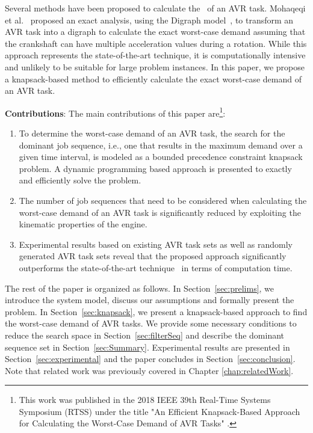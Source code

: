 Several methods have been proposed to calculate the \dbf~of an AVR task.
Mohaqeqi et al.~\cite{mohaqeqi_refinement_2017} proposed an exact analysis, using the Digraph model~\cite{stigge_digraph_2011}, to transform an AVR task into a digraph to calculate the exact worst-case demand assuming that the crankshaft can have multiple acceleration values during a rotation.
While this approach represents the state-of-the-art technique, it is computationally intensive and unlikely to be suitable for large problem instances.
In this paper, we propose a knapsack-based method to efficiently calculate the exact worst-case demand of an AVR task.

\noindent \textbf{Contributions}: The main contributions of this paper are\footnote{This work was published in the 2018 IEEE 39th Real-Time Systems Symposium (RTSS) under the title "An Efficient Knapsack-Based Approach for Calculating the Worst-Case Demand of AVR Tasks" \cite{bijinemula_efficient_2019}.}:
\begin{enumerate}
\item To determine the worst-case demand of an AVR task, the search for the dominant job sequence, i.e., one that results in the maximum demand over a given time interval, is modeled as a bounded precedence constraint knapsack problem.
A dynamic programming based approach is presented to exactly and efficiently solve the problem.
\item  The number of job sequences that need to be considered when calculating the worst-case demand of an AVR task is significantly reduced by exploiting the kinematic properties of the engine.
\item Experimental results based on existing AVR task sets as well as randomly generated AVR task sets reveal that the proposed approach significantly outperforms the state-of-the-art technique~\cite{mohaqeqi_refinement_2017} in terms of computation time.
\end{enumerate}

The rest of the paper is organized as follows.
In Section~\ref{sec:prelims}, we introduce the system model, discuss our assumptions and formally present the problem.
In Section~\ref{sec:knapsack}, we present a knapsack-based approach to find the worst-case demand of AVR tasks. %
We provide some necessary conditions to reduce the search space in Section~\ref{sec:filterSeq} and describe the dominant sequence set in Section~\ref{sec:Summary}.
Experimental results are presented in Section~\ref{sec:experimental} and the paper concludes in Section~\ref{sec:conclusion}.
Note that related work was previously covered in Chapter \ref{chap:relatedWork}.

